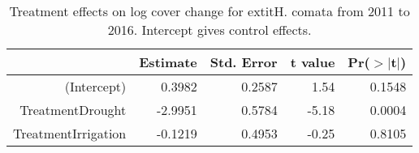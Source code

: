 \begin{table}[ht]
\centering
\caption{Treatment effects on log cover change for 	extit{H. comata} from 2011 to 2016. Intercept gives control effects.} 
\label{table:changeHECO}
\begin{tabular}{rrrrr}
  \hline
 & Estimate & Std. Error & t value & Pr($>$$|$t$|$) \\ 
  \hline
(Intercept) & 0.3982 & 0.2587 & 1.54 & 0.1548 \\ 
  TreatmentDrought & -2.9951 & 0.5784 & -5.18 & 0.0004 \\ 
  TreatmentIrrigation & -0.1219 & 0.4953 & -0.25 & 0.8105 \\ 
   \hline
\end{tabular}
\end{table}
